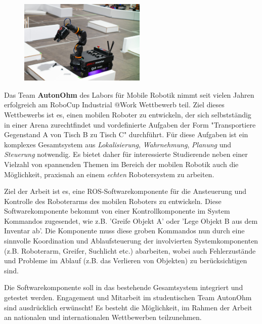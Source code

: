 \documentclass{ohm_project_description}
\begin{document}
\maketitle
\thispagestyle{fancy}

\vspace*{-2.5cm}
\begin{figure}[h!]
    \centering
    \includegraphics[height=4cm]{img/atwork.jpg}
\end{figure} 


Das Team \textbf{AutonOhm} des Labors für Mobile Robotik nimmt seit vielen Jahren erfolgreich am RoboCup Industrial @Work Wettbewerb teil. Ziel dieses Wettbewerbs ist es, einen mobilen Roboter zu entwickeln, der sich selbstständig in einer Arena zurechtfindet und vordefinierte Aufgaben der Form "Transportiere Gegenstand A von Tisch B zu Tisch C" durchführt. Für diese Aufgaben ist ein komplexes Gesamtsystem aus \emph{Lokalisierung}, \emph{Wahrnehmung}, \emph{Planung} und \emph{Steuerung} notwendig. Es bietet daher für interessierte Studierende neben einer Vielzahl von spannenden Themen im Bereich der mobilen Robotik auch die Möglichkeit, praxisnah an einem \emph{echten} Robotersystem zu arbeiten.

Ziel der Arbeit ist es, eine ROS-Softwarekomponente für die Ansteuerung und Kontrolle des Roboterarms des mobilen Roboters zu entwickeln. Diese Softwarekomponente bekommt von einer Kontrollkomponente im System Kommandos zugesendet, wie z.B. 'Greife Objekt A' oder 'Lege Objekt B aus dem Inventar ab'. Die Komponente muss diese groben Kommandos nun durch eine sinnvolle Koordination und Ablaufsteuerung der involvierten  Systemkomponenten (z.B. Roboterarm, Greifer, Suchlicht etc.) abarbeiten, wobei auch Fehlerzustände und Probleme im Ablauf (z.B. das Verlieren von Objekten) zu berücksichtigen sind.

Die Softwarekomponente soll in das bestehende Gesamtsystem integriert und getestet werden. Engagement und Mitarbeit im studentischen Team AutonOhm sind ausdrücklich erwünscht! Es besteht die Möglichkeit, im Rahmen der Arbeit an nationalen und internationalen Wettbewerben teilzunehmen.
\end{document}
